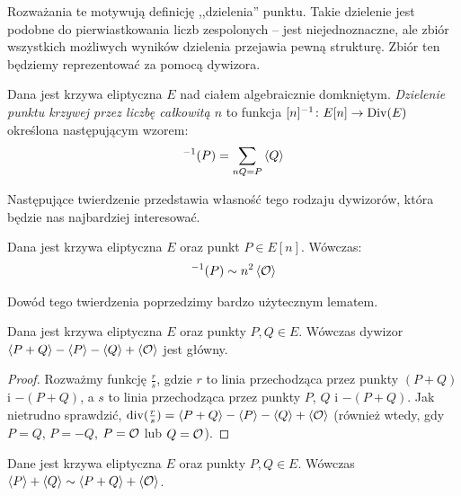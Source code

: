 Rozważania te motywują definicję ,,dzielenia'' punktu.
Takie dzielenie jest podobne do pierwiastkowania liczb zespolonych --
jest niejednoznaczne, ale zbiór wszystkich możliwych wyników dzielenia
przejawia pewną strukturę.
Zbiór ten będziemy reprezentować za pomocą dywizora.

\begin{definition}
Dana jest krzywa eliptyczna $E$ nad ciałem algebraicznie domkniętym.
\emph{Dzielenie punktu krzywej przez liczbę całkowitą $n$}
to funkcja $[n]^{-1} \colon E[n] \to \operatorname{Div}(E)$
określona następującym wzorem:
\begin{equation}
[n]^{-1}(P) = \sum_{nQ = P} \divi{Q}
\end{equation}
\end{definition}

Następujące twierdzenie przedstawia własność tego rodzaju dywizorów,
która będzie nas najbardziej interesować.

\begin{theorem}\label{point_division_divisor_principle_theorem}
Dana jest krzywa eliptyczna $E$ oraz punkt $P \in E[n]$.
Wówczas:
\begin{eqnarray*}
[n]^{-1}(P) \sim n^2\divi{\ecident}
\end{eqnarray*}
\end{theorem}

Dowód tego twierdzenia poprzedzimy bardzo użytecznym lematem.

\begin{lemma}\label{divi_reduction_lemma}
Dana jest krzywa eliptyczna $E$ oraz punkty $P, Q \in E$.
Wówczas dywizor $\left\langle P+Q\right\rangle - \left\langle P\right\rangle - \left\langle Q\right\rangle + \left\langle\mathcal{O}\right\rangle$
jest główny.
\end{lemma}

\begin{proof}
Rozważmy funkcję $\frac{r}{s}$,
gdzie $r$ to linia przechodząca przez punkty $(P+Q)$ i $-(P+Q)$,
a $s$ to linia przechodząca przez punkty $P$, $Q$ i $-(P+Q)$.
Jak nietrudno sprawdzić,
$\operatorname{div}(\frac{r}{s}) = \left\langle P+Q\right\rangle - \left\langle P\right\rangle - \left\langle Q\right\rangle + \left\langle\mathcal{O}\right\rangle$
(również wtedy, gdy $P = Q$, $P = -Q$, $P = \mathcal{O}$ lub $Q = \mathcal{O}$).
\end{proof}

\begin{corollary}\label{divi_sum_reduction_coro}
Dane jest krzywa eliptyczna $E$ oraz punkty $P, Q \in E$.
Wówczas $\left\langle P\right\rangle + \left\langle Q\right\rangle \sim \left\langle P+Q\right\rangle + \left\langle\mathcal{O}\right\rangle$.
\end{corollary}

